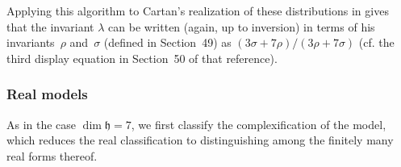 \documentclass[10pt,a4paper]{amsart}
\newcommand{\mfh} {\mathfrak{h}}
\numberwithin{equation}{section}
\begin{document}
Applying this algorithm to Cartan's realization of these distributions in \cite[Section~50]{CartanFiveVariables} gives that the invariant $\lambda$ can be written (again, up to inversion) in terms of his inva\-riants~$\rho$ and~$\sigma$ (defined in Section~49) as $(3 \sigma + 7 \rho) / (3 \rho + 7 \sigma)$ (cf. the third display equation in Section~50 of that reference).

\subsubsection{Real models}\label{subsubsection:identification-6-real}
As in the case $\dim \mfh = 7$, we first classify the complexification of the model, which reduces the real classification to distinguishing among the finitely many real forms thereof.
\end{document}
